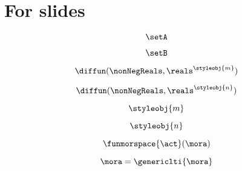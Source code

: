 
\section[For slides]{For slides}

\begin{forslides}

    \begin{equation}
        \label{eq:systems-000}
        \setA
    \end{equation}

    \begin{equation}
        \label{eq:systems-001}
        \setB
    \end{equation}

    \begin{equation}
        \label{eq:systems-002}
        \diffun(\nonNegReals, \reals^\styleobj{m})
    \end{equation}

    \begin{equation}
        \label{eq:systems-003}
       \diffun(\nonNegReals, \reals^\styleobj{n})
    \end{equation}

    \begin{equation}
        \label{eq:systems-004}
        \styleobj{m}
    \end{equation}

    \begin{equation}
        \label{eq:systems-005}
        \styleobj{n}
    \end{equation}

    \begin{equation}
        \label{eq:systems-006}
        \funmorspace{\act}(\mora)
    \end{equation}

    \begin{equation}
        \label{eq:systems-007}
        \mora = \genericlti{\mora}
    \end{equation}
    
\begin{comment}
    \begin{equation}
        \label{eq:systems-008}
        \projB(\tup{\ela,\elb}) = \elb
    \end{equation}

    \begin{equation}
        \label{eq:systems-009}
        \elna{1},\elna{2}\setin \reals
    \end{equation}


\end{comment}
\end{forslides}
